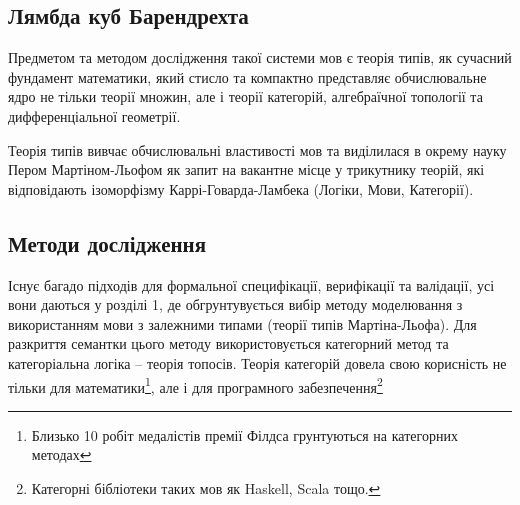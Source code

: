 \subsection*{Лямбда куб Барендрехта}
Предметом та методом дослідження такої системи мов є теорія типів,
як сучасний фундамент математики,
який стисло та компактно представляє обчислювальне ядро не тільки теорії множин,
але і теорії категорій, алгебраїчної топології та дифференціальної геометрії.

\begin{center}
\end{center}

Теорія типів вивчає обчислювальні властивості мов та виділилася
в окрему науку Пером Мартіном-Льофом як запит на вакантне місце у
трикутнику теорій, які відповідають ізоморфізму
Каррі-Говарда-Ламбека (Логіки, Мови, Категорії).

\subsection{Методи дослідження}
Існує багадо підходів для формальної специфікації,
верифікації та валідації, усі вони даються у розділі 1, де
обгрунтувується вибір методу моделювання з використанням
мови з залежними типами (теорії типів Мартіна-Льофа).
Для разкриття семантки цього методу використовується
категорний метод та категоріальна логіка -- теорія топосів.
Теорія категорій довела свою корисність не тільки для
математики\footnote{Близько 10 робіт медалістів премії
Філдса грунтуються на категорних методах},
але і для програмного
забезпечення\footnote{Категорні бібліотеки таких мов як Haskell, Scala тощо.}

